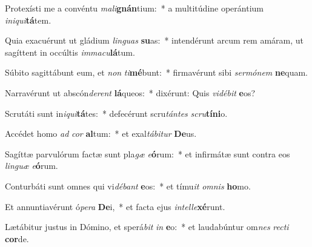 \item Protexísti me a convéntu \textit{ma}\textit{li}\textbf{gnán}tium:~* a multitúdine operántium \textit{in}\textit{i}\textit{qui}\textbf{tá}tem.
\item Quia exacuérunt ut gládium \textit{lin}\textit{guas} \textbf{su}as:~* intendérunt arcum rem amáram, ut sagíttent in occúltis \textit{im}\textit{ma}\textit{cu}\textbf{lá}tum.
\item Súbito sagittábunt eum, et \textit{non} \textit{ti}\textbf{mé}bunt:~* firmavérunt sibi \textit{ser}\textit{mó}\textit{nem} \textbf{ne}quam.
\item Narravérunt ut abscón\textit{de}\textit{rent} \textbf{lá}queos:~* dixérunt: Quis \textit{vi}\textit{dé}\textit{bit} \textbf{e}os?
\item Scrutáti sunt in\textit{i}\textit{qui}\textbf{tá}tes:~* defecérunt scru\textit{tán}\textit{tes} \textit{scru}\textbf{tí}\textbf{ni}o.
\item Accédet homo \textit{ad} \textit{cor} \textbf{al}tum:~* et exal\textit{tá}\textit{bi}\textit{tur} \textbf{De}us.
\item Sagíttæ parvulórum factæ sunt pla\textit{gæ} \textit{e}\textbf{ó}rum:~* et infirmátæ sunt contra eos \textit{lin}\textit{guæ} \textit{e}\textbf{ó}rum.
\item Conturbáti sunt omnes qui vi\textit{dé}\textit{bant} \textbf{e}os:~* et tímu\textit{it} \textit{om}\textit{nis} \textbf{ho}mo.
\item Et annuntiavérunt ó\textit{pe}\textit{ra} \textbf{De}i,~* et facta ejus \textit{in}\textit{tel}\textit{le}\textbf{xé}runt.
\item Lætábitur justus in Dómino, et sperá\textit{bit} \textit{in} \textbf{e}o:~* et laudabúntur om\textit{nes} \textit{rec}\textit{ti} \textbf{cor}de.
